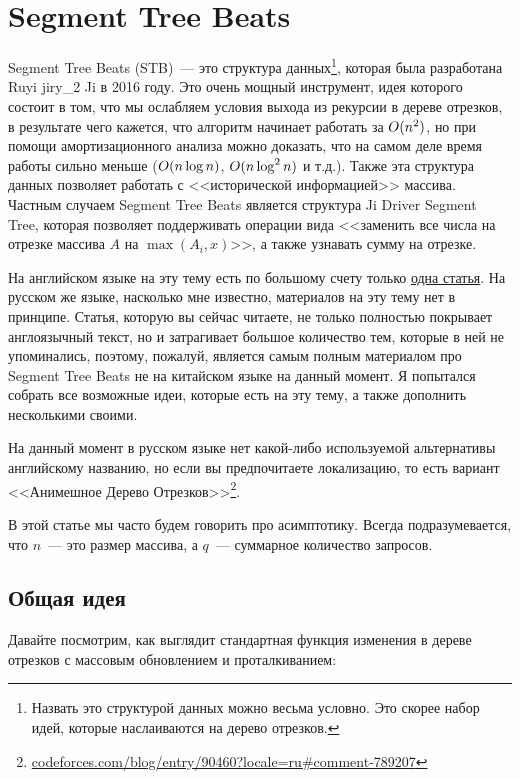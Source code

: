 \chapter{Segment Tree Beats}


Segment Tree Beats (STB)~--- это структура данных\footnote{Назвать это структурой данных можно весьма условно. Это скорее набор идей, которые наслаиваются на дерево отрезков.}, которая была разработана Ruyi jiry\_2 Ji в 2016 году. Это очень мощный инструмент, идея которого состоит в том, что мы ослабляем условия выхода из рекурсии в дереве отрезков, в результате чего кажется, что алгоритм начинает работать за $O(n^2)$, но при помощи амортизационного анализа можно доказать, что на самом деле время работы сильно меньше ($O(n \log n)$, $O(n \log^2 n)$ и т.д.). Также эта структура данных позволяет работать с <<исторической информацией>> массива. Частным случаем Segment Tree Beats является структура Ji Driver Segment Tree, которая позволяет поддерживать операции вида <<заменить все числа на отрезке массива $A$ на $\max(A_i, x)$>>, а также узнавать сумму на отрезке.

На английском языке на эту тему есть по большому счету только \href{https://codeforces.com/blog/entry/57319}{одна статья}. На русском же языке, насколько мне известно, материалов на эту тему нет в принципе. Статья, которую вы сейчас читаете, не только полностью покрывает англоязычный текст, но и затрагивает большое количество тем, которые в ней не упоминались, поэтому, пожалуй, является самым полным материалом про Segment Tree Beats не на китайском языке на данный момент. Я попытался собрать все возможные идеи, которые есть на эту тему, а также дополнить несколькими своими.

На данный момент в русском языке нет какой-либо используемой альтернативы английскому названию, но если вы предпочитаете локализацию, то есть вариант <<Анимешное Дерево Отрезков>>\footnote{\href{https://codeforces.com/blog/entry/90460?locale=ru\#comment-789207}{codeforces.com/blog/entry/90460?locale=ru\#comment-789207}}.

В этой статье мы часто будем говорить про асимптотику. Всегда подразумевается, что $n$~--- это размер массива, а $q$~--- суммарное количество запросов. 

\section{Общая идея}

Давайте посмотрим, как выглядит стандартная функция изменения в дереве отрезков с массовым обновлением и проталкиванием:

